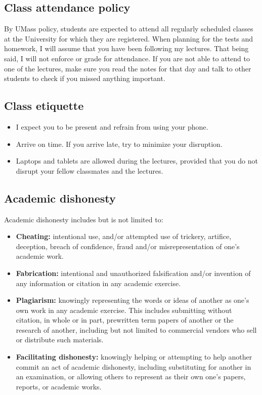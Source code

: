 \documentclass[11pt]{article}
\begin{document}
\subsection*{Class attendance policy}
\label{sec:orgf15d302}
By UMass policy, students are expected to attend all regularly scheduled
classes at the University for which they are registered. When planning for the
tests and homework, I will assume that you have been following my lectures.
That being said, I will not enforce or grade for attendance. If you are not
able to attend to one of the lectures, make sure you read the notes for that
day and talk to other students to check if you missed anything important.

\subsection*{Class etiquette}
\label{sec:org9c66549}
\begin{itemize}
\item I expect you to be present and refrain from using your phone.
\item Arrive on time. If you arrive late, try to minimize your disruption.
\item Laptops and tablets are allowed during the lectures, provided that you do not
disrupt your fellow classmates and the lectures.
\end{itemize}

\subsection*{Academic dishonesty}
\label{sec:org09bb200}

Academic dishonesty includes but is not limited to: 
\begin{itemize}
\item \textbf{Cheating:} intentional use, and/or attempted use of trickery, artifice,
deception, breach of confidence, fraud and/or misrepresentation of one's
academic work.
\item \textbf{Fabrication:} intentional and unauthorized falsification and/or invention of
any information or citation in any academic exercise.
\item \textbf{Plagiarism:} knowingly representing the words or ideas of another as one's
own work in any academic exercise. This includes submitting without citation,
in whole or in part, prewritten term papers of another or the research of
another, including but not limited to commercial vendors who sell or
distribute such materials.
\item \textbf{Facilitating dishonesty:} knowingly helping or attempting to help another
commit an act of academic dishonesty, including substituting for another in
an examination, or allowing others to represent as their own one's papers,
reports, or academic works.
\end{itemize}
\end{document}
